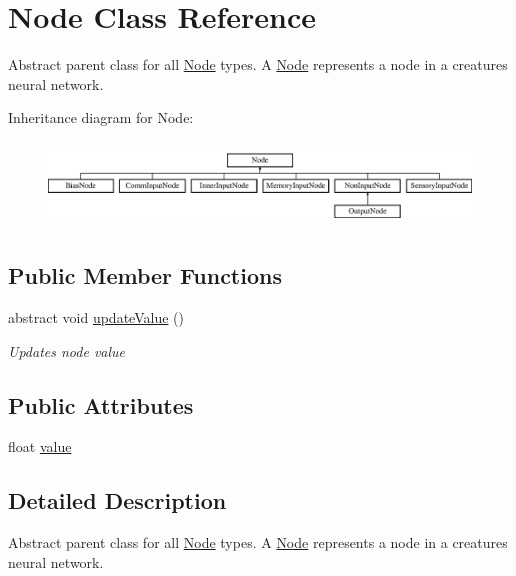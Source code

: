 \hypertarget{class_node}{}\section{Node Class Reference}
\label{class_node}


Abstract parent class for all \mbox{\hyperlink{class_node}{Node}} types. A \mbox{\hyperlink{class_node}{Node}} represents a node in a creatures neural network.  


Inheritance diagram for Node\+:\begin{figure}[H]
\begin{center}
\leavevmode
\includegraphics[height=2.258065cm]{class_node}
\end{center}
\end{figure}
\subsection*{Public Member Functions}
\begin{DoxyCompactItemize}
\item 
abstract void \mbox{\hyperlink{class_node_a85ebd0e36c25430570b94f923afd2a62}{update\+Value}} ()
\begin{DoxyCompactList}\small\item\em Updates node value \end{DoxyCompactList}\end{DoxyCompactItemize}
\subsection*{Public Attributes}
\begin{DoxyCompactItemize}
\item 
float \mbox{\hyperlink{class_node_a4d82b89fd1d72cc0184763279a3811dc}{value}}
\end{DoxyCompactItemize}


\subsection{Detailed Description}
Abstract parent class for all \mbox{\hyperlink{class_node}{Node}} types. A \mbox{\hyperlink{class_node}{Node}} represents a node in a creatures neural network. 



